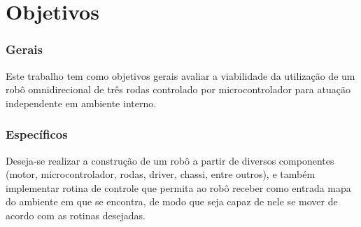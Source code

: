 \chapter{Objetivos}

\subsection*{Gerais}
Este trabalho tem como objetivos gerais avaliar a viabilidade da utilização de 
um robô omnidirecional de três rodas controlado por microcontrolador para 
atuação independente em ambiente interno.

\subsection*{Específicos}
Deseja-se realizar a construção de um robô a partir de diversos componentes 
(motor, microcontrolador, rodas, driver, chassi, entre outros), e também 
implementar rotina de controle que permita ao robô receber como entrada mapa
do ambiente em que se encontra, de modo que seja capaz de nele se mover de 
acordo com as rotinas desejadas.